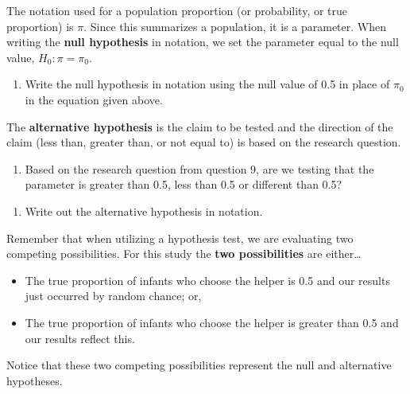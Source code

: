 \documentclass[
]{report}
\providecommand{\tightlist}{%
  \setlength{\itemsep}{0pt}\setlength{\parskip}{0pt}}
\begin{document}
The notation used for a population proportion (or probability, or true proportion) is \(\pi\). Since this summarizes a population, it is a parameter. When writing the \textbf{null hypothesis} in notation, we set the parameter equal to the null value, \(H_0: \pi = \pi_0\).

\begin{enumerate}
\def\labelenumi{\arabic{enumi}.}
\setcounter{enumi}{10}
\tightlist
\item
  Write the null hypothesis in notation using the null value of 0.5 in place of \(\pi_0\) in the equation given above.
\end{enumerate}

\vspace{0.2in}

The \textbf{alternative hypothesis} is the claim to be tested and the direction of the claim (less than, greater than, or not equal to) is based on the research question.

\begin{enumerate}
\def\labelenumi{\arabic{enumi}.}
\setcounter{enumi}{11}
\tightlist
\item
  Based on the research question from question 9, are we testing that the parameter is greater than 0.5, less than 0.5 or different than 0.5?
\end{enumerate}

\vspace{0.2in}

\begin{enumerate}
\def\labelenumi{\arabic{enumi}.}
\setcounter{enumi}{12}
\tightlist
\item
  Write out the alternative hypothesis in notation.
\end{enumerate}

\vspace{0.2in}

Remember that when utilizing a hypothesis test, we are evaluating two competing possibilities. For this study the \textbf{two possibilities} are either\ldots{}

\begin{itemize}
\item
  The true proportion of infants who choose the helper is 0.5 and our results just occurred by random chance; or,
\item
  The true proportion of infants who choose the helper is greater than 0.5 and our results reflect this.
\end{itemize}

Notice that these two competing possibilities represent the null and alternative hypotheses.
\end{document}
